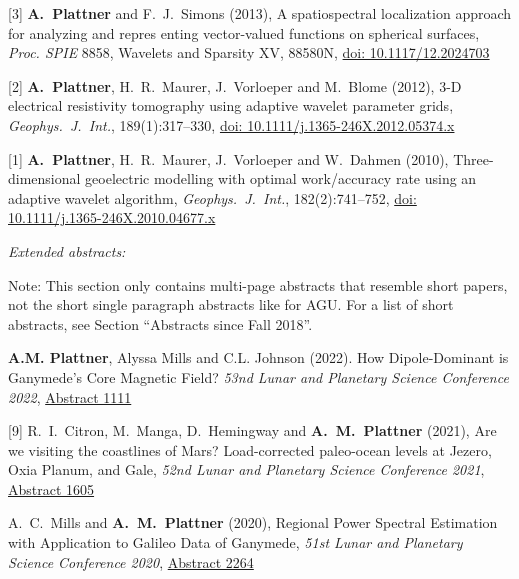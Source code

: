 \documentclass[10pt]{article}
\begin{document}
\spcp
\hspace{-0.5cm}[3] \textbf{A.~Plattner} and F.~J.~Simons (2013), 
A spatiospectral localization approach for analyzing and repres enting vector-valued functions on spherical surfaces,
\emph{Proc. SPIE} 8858, Wavelets and Sparsity XV, 88580N,
\href{http://proceedings.spiedigitallibrary.org/proceeding.aspx?articleid=1745029}{doi: 10.1117/12.2024703}

\spcp
\hspace{-0.5cm}[2] \textbf{A.~Plattner}, H.~R.~Maurer, J.~Vorloeper and M.~Blome (2012),
3-D electrical resistivity tomography using adaptive wavelet parameter grids,
\emph{Geophys.~J.~Int.}, 189(1):317--330,
\href{https://academic.oup.com/gji/article-lookup/doi/10.1111/j.1365-246X.2012.05374.x}{doi: 10.1111/j.1365-246X.2012.05374.x}

\spcp
\hspace{-0.5cm}[1] \textbf{A.~Plattner}, H.~R.~Maurer, J.~Vorloeper and W.~Dahmen (2010),
Three-dimensional geoelectric modelling with optimal work/accuracy rate 
using an adaptive wavelet algorithm,
\emph{Geophys.~J.~Int.}, 182(2):741--752,
\href{https://academic.oup.com/gji/article-lookup/doi/10.1111/j.1365-246X.2010.04677.x}{doi: 10.1111/j.1365-246X.2010.04677.x}

\spc
\emph{Extended abstracts:}

\vspace{0.2cm}
Note: This section only contains multi-page abstracts that resemble short papers, not the short single paragraph abstracts like for AGU. For a list of short abstracts, see Section ``Abstracts since Fall 2018''.

\spcp
\shift [10] \textbf{A.M. Plattner}, Alyssa Mills and C.L. Johnson (2022). How Dipole-Dominant is Ganymede's Core Magnetic Field?
\emph{53nd Lunar and Planetary Science Conference 2022},
\href{https://www.hou.usra.edu/meetings/lpsc2022/pdf/1111.pdf}{Abstract 1111}
\spcp

\hspace{-0.5cm}[9] R.~I.~Citron, M.~Manga, D.~Hemingway and \textbf{A.~M.~Plattner} (2021),
Are we visiting the coastlines of Mars? Load-corrected paleo-ocean levels at Jezero, Oxia Planum, and Gale,
\emph{52nd Lunar and Planetary Science Conference 2021},
\href{https://www.hou.usra.edu/meetings/lpsc2021/pdf/1605.pdf}{Abstract 1605}

\spcp
\hspace{-0.77cm} \gr[8] A.~C.~Mills and \textbf{A.~M.~Plattner}
(2020),
Regional Power Spectral Estimation with Application to Galileo Data of Ganymede,
\emph{51st Lunar and Planetary Science Conference 2020},
\href{https://www.hou.usra.edu/meetings/lpsc2020/pdf/2264.pdf}{Abstract 2264}
\end{document}
